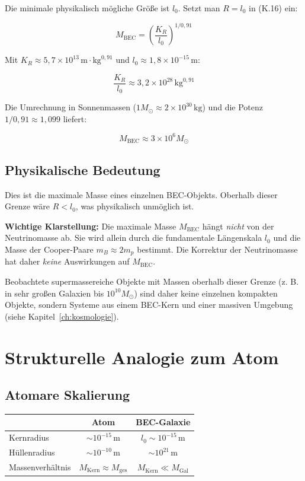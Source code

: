 Die minimale physikalisch mögliche Größe ist \( l_0 \). Setzt man \( R = l_0 \) in (K.16) ein:

\[
M_{\text{BEC}} = \left( \frac{K_R}{l_0} \right)^{1/0,91} \tag{K.19}
\]

Mit \( K_R \approx 5,7 \times 10^{13} \, \text{m} \cdot \text{kg}^{0,91} \) und \( l_0 \approx 1,8 \times 10^{-15} \, \text{m} \):

\[
\frac{K_R}{l_0} \approx 3,2 \times 10^{28} \, \text{kg}^{0,91}
\]

Die Umrechnung in Sonnenmassen (\( 1 M_{\odot} \approx 2 \times 10^{30} \, \text{kg} \)) und die Potenz \( 1/0,91 \approx 1,099 \) liefert:

\[
M_{\text{BEC}} \approx 3 \times 10^6 M_{\odot} \tag{K.20}
\]

\subsection{Physikalische Bedeutung}
\label{sub:bec_max_bedeutung}

Dies ist die maximale Masse eines einzelnen BEC-Objekts. Oberhalb dieser Grenze wäre \( R < l_0 \), was physikalisch unmöglich ist.

\textbf{Wichtige Klarstellung:} Die maximale Masse \( M_{\text{BEC}} \) hängt \emph{nicht} von der Neutrinomasse ab. Sie wird allein durch die fundamentale Längenskala \( l_0 \) und die Masse der Cooper-Paare \( m_B \approx 2m_p \) bestimmt. Die Korrektur der Neutrinomasse hat daher \emph{keine} Auswirkungen auf \( M_{\text{BEC}} \).

Beobachtete supermassereiche Objekte mit Massen oberhalb dieser Grenze (z. B. in sehr großen Galaxien bis \( 10^{10} M_{\odot} \)) sind daher keine einzelnen kompakten Objekte, sondern Systeme aus einem BEC-Kern und einer massiven Umgebung (siehe Kapitel~\ref{ch:kosmologie}).

\section{Strukturelle Analogie zum Atom}
\label{app:bec_atom_analogie}

\subsection{Atomare Skalierung}
\label{sub:bec_atom_tabelle}

\begin{center}
\begin{tabular}{lcc}
\hline
 & \textbf{Atom} & \textbf{BEC-Galaxie} \\
\hline
Kernradius & \( \sim 10^{-15} \, \text{m} \) & \( l_0 \sim 10^{-15} \, \text{m} \) \\
Hüllenradius & \( \sim 10^{-10} \, \text{m} \) & \( \sim 10^{21} \, \text{m} \) \\
Massenverhältnis & \( M_{\text{Kern}} \approx M_{\text{ges}} \) & \( M_{\text{Kern}} \ll M_{\text{Gal}} \) \\
\hline
\end{tabular}
\end{center}

